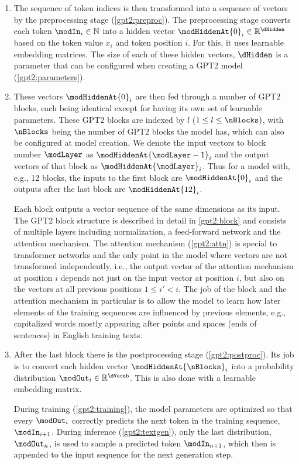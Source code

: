 \begin{enumerate}
	\item The sequence of token indices is then transformed into a sequence of vectors by the preprocessing stage (\cref{gpt2:preproc}). The preprocessing stage converts each token $\modIn_i \in \mathbb{N}$ into a hidden vector $\modHiddenAt{0}_i \in \mathbb{R}^\dHidden$ based on the token value $x_i$ and token position $i$. For this, it uses learnable embedding matrices.
	The size of each of these hidden vectors, $\dHidden$ is a parameter that can be configured when creating a GPT2 model (\cref{gpt2:parameters}).
	
	\item These vectors $\modHiddenAt{0}_i$ are then fed through a number of GPT2 blocks, each being identical except for having its own set of learnable parameters. These GPT2 blocks are indexed by $l$ ($1 \leq l \leq \nBlocks)$, with $\nBlocks$ being the number of GPT2 blocks the model has, which can also be configured at model creation.
	We denote the input vectors to block number $\modLayer$ as $\modHiddenAt{\modLayer-1}_i$ and the output vectors of that block as $\modHiddenAt{\modLayer}_i$. Thus for a model with, e.g., 12 blocks, the inputs to the first block are $\modHiddenAt{0}_i$ and the outputs after the last block are $\modHiddenAt{12}_i$.
	
	Each block outputs a vector sequence of the same dimensions as its input.
	The GPT2 block structure is described in detail in \cref{gpt2:block} and consists of multiple layers including normalization, a feed-forward network and the attention mechanism. The attention mechanism (\cref{gpt2:attn}) is special to transformer networks and the only point in the model where vectors are not transformed independently, i.e., the output vector of the attention mechanism at position $i$  depends not just on the input vector at position $i$, but also on the vectors at all previous positions $1 \leq i' < i$.
	The job of the block and the attention mechanism in particular is to allow the model to learn how later elements of the training sequences are influenced by previous elements, e.g., capitalized words mostly appearing after points and spaces (ends of sentences) in English training texts.
	
	\item After the last block there is the postprocessing stage (\cref{gpt2:postproc}). Its job is to convert each hidden vector $\modHiddenAt{\nBlocks}_i$ into a probability distribution $\modOut_i \in \mathbb{R}^{\dVocab}$. This is also done with a learnable embedding matrix.
	
	During training (\cref{gpt2:training}), the model parameters are optimized so that every $\modOut_i$ correctly predicts the next token in the training sequence, $\modIn_{i+1}$.
	During inference (\cref{gpt2:textgen}), only the last distribution, $\modOut_n$, is used to sample a predicted token $\modIn_{n+1}$, which then is appended to the input sequence for the next generation step.
\end{enumerate}

